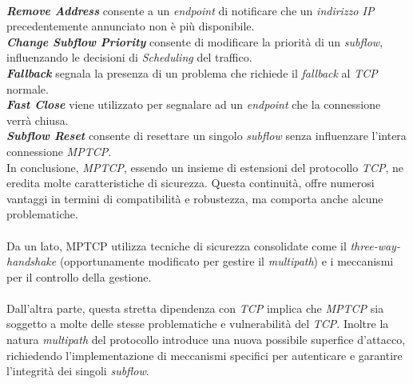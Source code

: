 \\
\indent \textbf{\emph{Remove Address}} consente a un \emph{endpoint} di notificare che un \emph{indirizzo IP} precedentemente annunciato non è più disponibile.
\\
\indent \textbf{\emph{Change Subflow Priority}} consente di modificare la priorità di un \emph{subflow}, influenzando le decisioni di \emph{Scheduling} del traffico.
\\
\indent \textbf{\emph{Fallback}} segnala la presenza di un problema che richiede il \emph{fallback} al \emph{TCP} normale.
\\
\indent \textbf{\emph{Fast Close}} viene utilizzato per segnalare ad un \emph{endpoint} che la connessione verrà chiusa.
\\
\indent \textbf{\emph{Subflow Reset}} consente di resettare un singolo \emph{subflow} senza influenzare l'intera connessione \emph{MPTCP}.
\\

\indent In conclusione, \emph{MPTCP}, essendo un insieme di estensioni del protocollo \emph{TCP}, ne eredita molte caratteristiche di sicurezza. Questa continuità, offre numerosi vantaggi in termini di compatibilità e robustezza, ma comporta anche alcune problematiche.
\\\\
Da un lato, {MPTCP} utilizza tecniche di sicurezza consolidate come il \emph{three-way-handshake} (opportunamente modificato per gestire il \emph{multipath}) e i meccanismi per il controllo della gestione. 
\\\\
Dall'altra parte, questa stretta dipendenza con \emph{TCP} implica che \emph{MPTCP} sia soggetto a molte delle stesse problematiche e vulnerabilità del \emph{TCP}. 
Inoltre la natura \emph{multipath} del protocollo introduce una nuova possibile superfice d'attacco, richiedendo l'implementazione di meccanismi specifici per autenticare e garantire l'integrità dei singoli \emph{subflow}.

